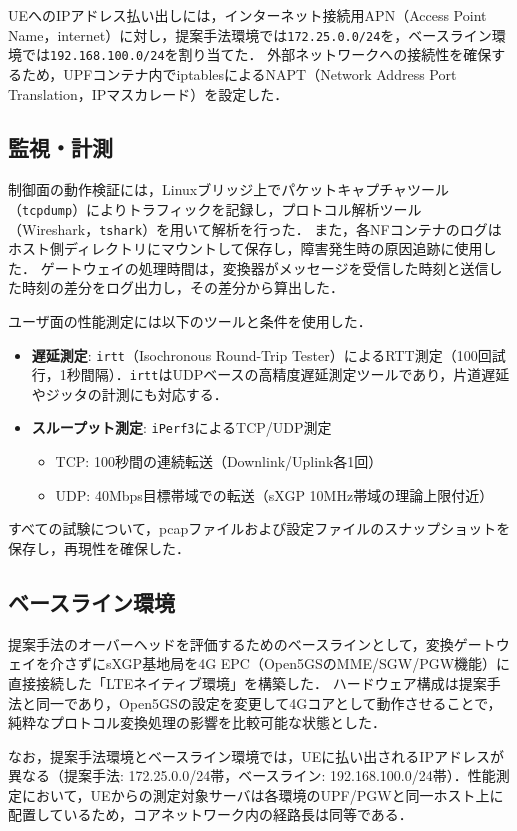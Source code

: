 UEへのIPアドレス払い出しには，インターネット接続用APN（Access Point Name，internet）に対し，提案手法環境では\texttt{172.25.0.0/24}を，ベースライン環境では\texttt{192.168.100.0/24}を割り当てた．
外部ネットワークへの接続性を確保するため，UPFコンテナ内でiptablesによるNAPT（Network Address Port Translation，IPマスカレード）を設定した．

\subsection{監視・計測}
制御面の動作検証には，Linuxブリッジ上でパケットキャプチャツール（\texttt{tcpdump}）によりトラフィックを記録し，プロトコル解析ツール（Wireshark，\texttt{tshark}）を用いて解析を行った．
また，各NFコンテナのログはホスト側ディレクトリにマウントして保存し，障害発生時の原因追跡に使用した．
ゲートウェイの処理時間は，変換器がメッセージを受信した時刻と送信した時刻の差分をログ出力し，その差分から算出した．

ユーザ面の性能測定には以下のツールと条件を使用した．
\begin{itemize}
    \item \textbf{遅延測定}: \texttt{irtt}（Isochronous Round-Trip Tester）によるRTT測定（100回試行，1秒間隔）．\texttt{irtt}はUDPベースの高精度遅延測定ツールであり，片道遅延やジッタの計測にも対応する．
    \item \textbf{スループット測定}: \texttt{iPerf3}によるTCP/UDP測定
    \begin{itemize}
        \item TCP: 100秒間の連続転送（Downlink/Uplink各1回）
        \item UDP: 40Mbps目標帯域での転送（sXGP 10MHz帯域の理論上限付近）
    \end{itemize}
\end{itemize}
すべての試験について，pcapファイルおよび設定ファイルのスナップショットを保存し，再現性を確保した．

\subsection{ベースライン環境}
提案手法のオーバーヘッドを評価するためのベースラインとして，変換ゲートウェイを介さずにsXGP基地局を4G EPC（Open5GSのMME/SGW/PGW機能）に直接接続した「LTEネイティブ環境」を構築した．
ハードウェア構成は提案手法と同一であり，Open5GSの設定を変更して4Gコアとして動作させることで，純粋なプロトコル変換処理の影響を比較可能な状態とした．

なお，提案手法環境とベースライン環境では，UEに払い出されるIPアドレスが異なる（提案手法: 172.25.0.0/24帯，ベースライン: 192.168.100.0/24帯）．性能測定において，UEからの測定対象サーバは各環境のUPF/PGWと同一ホスト上に配置しているため，コアネットワーク内の経路長は同等である．

